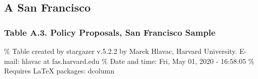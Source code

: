 \documentclass[]{article}
\begin{document}
\hypertarget{a-san-francisco}{%
\subsection{A San Francisco}\label{a-san-francisco}}

\hypertarget{table-a.3.-policy-proposals-san-francisco-sample}{%
\subsubsection{Table A.3. Policy Proposals, San Francisco Sample}\label{table-a.3.-policy-proposals-san-francisco-sample}}

\% Table created by stargazer v.5.2.2 by Marek Hlavac, Harvard University. E-mail: hlavac at fas.harvard.edu
\% Date and time: Fri, May 01, 2020 - 16:58:05
\% Requires LaTeX packages: dcolumn
\end{document}
